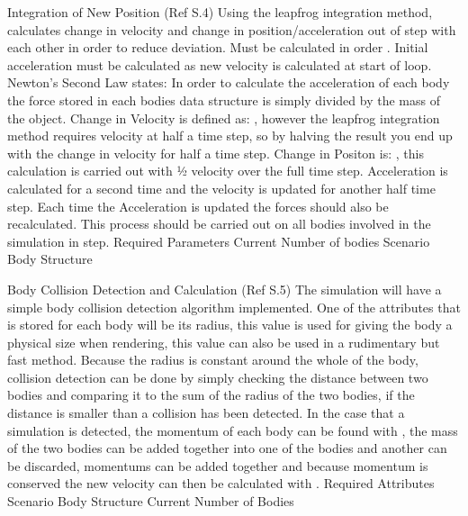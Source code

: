 Integration of New Position (Ref S.4)
Using the leapfrog integration method, calculates change in velocity and change in position/acceleration out of step with each other in order to reduce deviation.
Must be calculated in order  .
Initial acceleration must be calculated as new velocity is calculated at start of loop.
Newton’s Second Law states: 
In order to calculate the acceleration of each body the force stored in each bodies data structure is simply divided by the mass of the object.
Change in Velocity is defined as: , however the leapfrog integration method requires velocity at half a time step, so by halving the result you end up with the change in velocity for half a time step.
Change in Positon is: , this calculation is carried out with ½  velocity over the full time step.
Acceleration is calculated for a second time and the velocity is updated for another half time step.
Each time the Acceleration is updated the forces should also be recalculated.
This process should be carried out on all bodies involved in the simulation in step.
Required Parameters
Current Number of bodies
Scenario Body Structure


Body Collision Detection and Calculation (Ref S.5)
The simulation will have a simple body collision detection algorithm implemented.
One of the attributes that is stored for each body will be its radius, this value is used for giving the body a physical size when rendering, this value can also be used in a rudimentary but fast method.
Because the radius is constant around the whole of the body, collision detection can be done by simply checking the distance between two bodies and comparing it to the sum of the radius of the two bodies, if the distance is smaller than a collision has been detected.
In the case that a simulation is detected, the momentum of each body can be found with , the mass of the two bodies can be added together into one of the bodies and another can be discarded, momentums can be added together and because momentum is conserved the new velocity can then be calculated with .
Required Attributes
Scenario Body Structure
Current Number of Bodies

